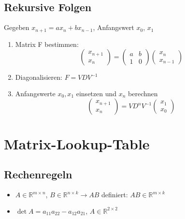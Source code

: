 \documentclass[german, fourcolumn, 8pt]{latex4ei/latex4ei_sheet}
\begin{document}
\begin{sectionbox}
    \subsection{Rekursive Folgen}
    Gegeben $x_{n+1}=ax_n+bx_{n-1}$, Anfangswert $x_0$, $x_1$
    \begin{enumerate}
        \item Matrix F bestimmen: \begin{equation*}
            \begin{pmatrix}
                x_{n+1} \\ x_n
            \end{pmatrix} = \begin{pmatrix}
            a & b \\ 1 & 0
            \end{pmatrix}\begin{pmatrix}
                x_n \\ x_{n-1}
            \end{pmatrix}
        \end{equation*}
        \item Diagonalisieren: $F=VDV^{-1}$
        \item Anfangswerte $x_0, x_1$ einsetzen und $x_n$ berechnen\begin{equation*}
            \begin{pmatrix}
                x_{n+1}\\x_n
            \end{pmatrix} = VD^nV^{-1}\begin{pmatrix}
                x_1 \\ x_0
            \end{pmatrix}
        \end{equation*}
    \end{enumerate}
\end{sectionbox}

\section{Matrix-Lookup-Table}
\begin{sectionbox}
    \subsection{Rechenregeln}
    \begin{itemize}
        \item $A \in \mathbb R^{m \times n}$, $B \in \mathbb R^{n\times k} \rightarrow AB$ definiert: $AB \in \mathbb R^{m \times k}$
        \item $\det A = a_{11}a_{22}-a_{12}a_{21}$, $A \in \mathbb R^{2\times 2}$
    \end{itemize}
\end{sectionbox}
\end{document}
